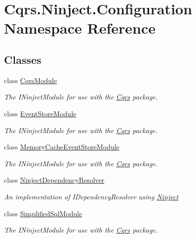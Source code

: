\hypertarget{namespaceCqrs_1_1Ninject_1_1Configuration}{}\section{Cqrs.\+Ninject.\+Configuration Namespace Reference}
\label{namespaceCqrs_1_1Ninject_1_1Configuration}
\subsection*{Classes}
\begin{DoxyCompactItemize}
\item 
class \hyperlink{classCqrs_1_1Ninject_1_1Configuration_1_1CqrsModule}{Cqrs\+Module}
\begin{DoxyCompactList}\small\item\em The I\+Ninject\+Module for use with the \hyperlink{namespaceCqrs}{Cqrs} package. \end{DoxyCompactList}\item 
class \hyperlink{classCqrs_1_1Ninject_1_1Configuration_1_1EventStoreModule}{Event\+Store\+Module}
\begin{DoxyCompactList}\small\item\em The I\+Ninject\+Module for use with the \hyperlink{namespaceCqrs}{Cqrs} package. \end{DoxyCompactList}\item 
class \hyperlink{classCqrs_1_1Ninject_1_1Configuration_1_1MemoryCacheEventStoreModule}{Memory\+Cache\+Event\+Store\+Module}
\begin{DoxyCompactList}\small\item\em The I\+Ninject\+Module for use with the \hyperlink{namespaceCqrs}{Cqrs} package. \end{DoxyCompactList}\item 
class \hyperlink{classCqrs_1_1Ninject_1_1Configuration_1_1NinjectDependencyResolver}{Ninject\+Dependency\+Resolver}
\begin{DoxyCompactList}\small\item\em An implementation of I\+Dependency\+Resolver using \hyperlink{namespaceCqrs_1_1Ninject}{Ninject} \end{DoxyCompactList}\item 
class \hyperlink{classCqrs_1_1Ninject_1_1Configuration_1_1SimplifiedSqlModule}{Simplified\+Sql\+Module}
\begin{DoxyCompactList}\small\item\em The I\+Ninject\+Module for use with the \hyperlink{namespaceCqrs}{Cqrs} package. \end{DoxyCompactList}\end{DoxyCompactItemize}

